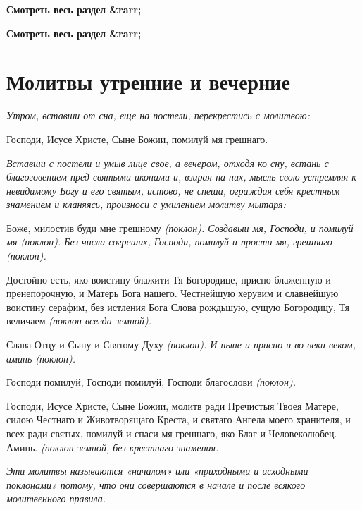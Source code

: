 


\bfseries Смотреть весь раздел &rarr;\normalfont{} 


\bfseries Смотреть весь раздел &rarr;\normalfont{} 

\section{Молитвы утренние и вечерние}
 


\itshape Утром, вставши от сна, еще на постели, перекрестись с молитвою:\normalfont{}


Господи, Исусе Христе, Сыне Божии, помилуй мя грешнаго.


\itshape Вставши с постели и умыв лице свое, а вечером, отходя ко сну, встань с благоговением пред святыми иконами и, взирая на них, мысль свою устремляя к невидимому Богу и его святым, истово, не спеша, ограждая себя крестным знамением и кланяясь, произноси с умилением молитву мытаря:\normalfont{}


Боже, милостив буди мне грешному \itshape (поклон)\normalfont{}. Создавыи мя, Господи, и помилуй мя \itshape (поклон)\normalfont{}. Без числа согреших, Господи, помилуй и прости мя, грешнаго \itshape (поклон)\normalfont{}.


Достойно есть, яко воистину блажити Тя Богородице, присно блаженную и пренепорочную, и Матерь Бога нашего. Честнейшую херувим и славнейшую воистину серафим, без истления Бога Слова рождьшую, сущую Богородицу, Тя величаем \itshape (поклон всегда земной)\normalfont{}.


Слава Отцу и Сыну и Святому Духу \itshape (поклон)\normalfont{}. И ныне и присно и во веки веком, аминь \itshape (поклон)\normalfont{}.


Господи помилуй, Господи помилуй, Господи благослови \itshape (поклон)\normalfont{}.


Господи, Исусе Христе, Сыне Божии, молитв ради Пречистыя Твоея Матере, силою Честнаго и Животворящаго Креста, и святаго Ангела моего хранителя, и всех ради святых, помилуй и спаси мя грешнаго, яко Благ и Человеколюбец. Аминь. \itshape (поклон земной, без крестнаго знамения\normalfont{}.


\itshape Эти молитвы называются «началом» или «приходными и исходными поклонами» потому, что они совершаются в начале и после всякого молитвенного правила.\normalfont{}


